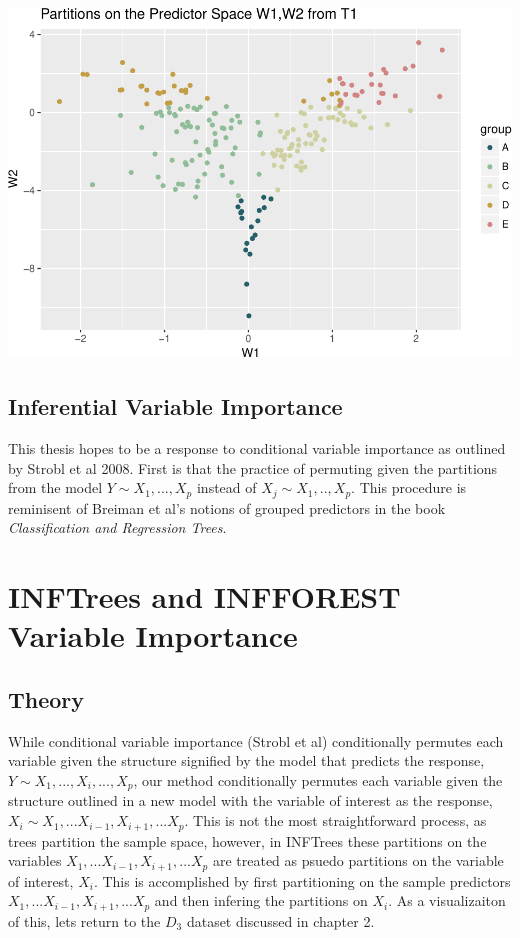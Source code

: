 \documentclass[12pt,twoside]{reedthesis}
\begin{document}
  \includegraphics{Thesis_files/figure-latex/unnamed-chunk-6-1.pdf}
  
  \section{Inferential Variable
  Importance}\label{inferential-variable-importance}
  
  This thesis hopes to be a response to conditional variable importance as
  outlined by Strobl et al 2008. First is that the practice of permuting
  given the partitions from the model \(Y \sim X_1,...,X_p\) instead of
  \(X_j \sim X_1,..,X_p\). This procedure is reminisent of Breiman et al's
  notions of grouped predictors in the book \emph{Classification and
  Regression Trees}.
  
  \chapter{INFTrees and INFFOREST Variable
  Importance}\label{inftrees-and-infforest-variable-importance}
  
  \section{Theory}\label{theory}
  
  While conditional variable importance (Strobl et al) conditionally
  permutes each variable given the structure signified by the model that
  predicts the response, \(Y \sim X_1,...,X_i,...,X_p\), our method
  conditionally permutes each variable given the structure outlined in a
  new model with the variable of interest as the response,
  \(X_i \sim X_1,...X_{i-1},X_{i+1},...X_p\). This is not the most
  straightforward process, as trees partition the sample space, however,
  in INFTrees these partitions on the variables
  \(X_1,...X_{i-1},X_{i+1},...X_p\) are treated as psuedo partitions on
  the variable of interest, \(X_i\). This is accomplished by first
  partitioning on the sample predictors \(X_1,...X_{i-1},X_{i+1},...X_p\)
  and then infering the partitions on \(X_i\). As a visualizaiton of this,
  lets return to the \(D_{3}\) dataset discussed in chapter 2.
  
\end{document}
